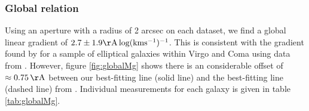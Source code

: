 		\subsubsection{Global relation}
			Using an aperture with a radius of 2 arcsec on each dataset, we find a global linear gradient of $2.7\pm1.9 \mathrm{\AA \, log(km s^{-1})^{-1}}$. This is consistent with the gradient found by \citet{Ziegler1997} for a sample of elliptical galaxies within Virgo and Coma using data from \citet{Dressler1987}. However, figure \ref{fig:globalMg} shows there is an considerable offset of $\approx0.75\,\mathrm{\AA}$ between our best-fitting line (solid line) and the best-fitting line (dashed line) from \citet{Ziegler1997}. Individual measurements for each galaxy is given in table \ref{tab:globalMg}.

